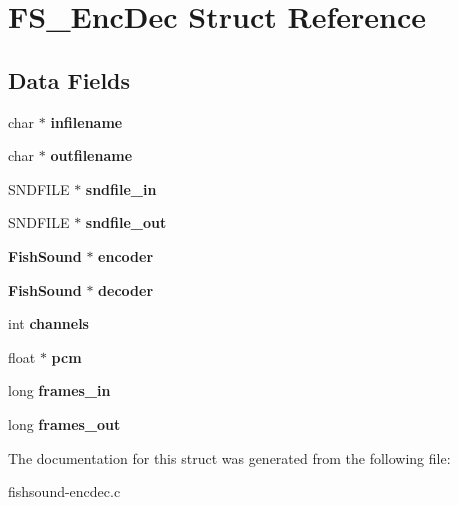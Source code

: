 \section{\-F\-S\-\_\-\-Enc\-Dec \-Struct \-Reference}
\label{structFS__EncDec}
\subsection*{\-Data \-Fields}
\begin{DoxyCompactItemize}
\item 
char $\ast$ {\bfseries infilename}\label{structFS__EncDec_a762f643381a90b9867a9fb7869388995}

\item 
char $\ast$ {\bfseries outfilename}\label{structFS__EncDec_af95bc9fddf4942c6c6ac324db1223739}

\item 
\-S\-N\-D\-F\-I\-L\-E $\ast$ {\bfseries sndfile\-\_\-in}\label{structFS__EncDec_a63cdfe09721bda3d6e4d62fbe3a592c2}

\item 
\-S\-N\-D\-F\-I\-L\-E $\ast$ {\bfseries sndfile\-\_\-out}\label{structFS__EncDec_a5dca5e395c542d4548b8199b48d353fd}

\item 
{\bf \-Fish\-Sound} $\ast$ {\bfseries encoder}\label{structFS__EncDec_aad7afeba18b1755a59d0ca54a6910714}

\item 
{\bf \-Fish\-Sound} $\ast$ {\bfseries decoder}\label{structFS__EncDec_a661af2889e39bb23b350d585fe6b3b13}

\item 
int {\bfseries channels}\label{structFS__EncDec_a5a5abd928df34ccb6e53ef151b2834b5}

\item 
float $\ast$ {\bfseries pcm}\label{structFS__EncDec_af3cb2d40d03b6e2e85abf4ea0b50df4b}

\item 
long {\bfseries frames\-\_\-in}\label{structFS__EncDec_adb2b0b3b8015f11f5ba1adc3e2bbcdc4}

\item 
long {\bfseries frames\-\_\-out}\label{structFS__EncDec_a8ebbfc555755b5fccc3ccf7447dd43ae}

\end{DoxyCompactItemize}


\-The documentation for this struct was generated from the following file\-:\begin{DoxyCompactItemize}
\item 
fishsound-\/encdec.\-c\end{DoxyCompactItemize}
